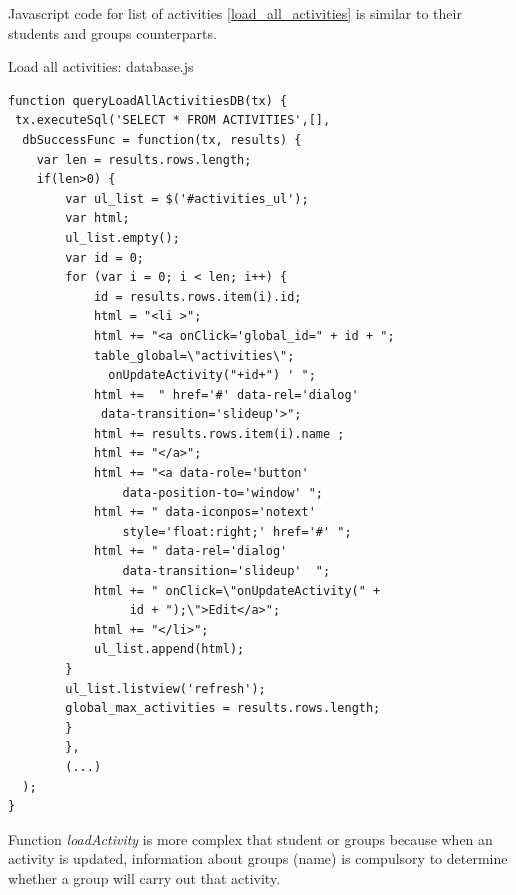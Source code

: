 Javascript code for list of activities \ref{load_all_activities} is similar to their students and groups counterparts.

\begin{bclogo}[couleur=blue!30,arrondi=0.1,ombre=true ] 
{Load all activities: database.js \label{load_all_activities}}
\begin{verbatim}
function queryLoadAllActivitiesDB(tx) {
 tx.executeSql('SELECT * FROM ACTIVITIES',[],
  dbSuccessFunc = function(tx, results) {
    var len = results.rows.length;
    if(len>0) {
        var ul_list = $('#activities_ul');
        var html;
        ul_list.empty();
        var id = 0;
        for (var i = 0; i < len; i++) {
            id = results.rows.item(i).id;
            html = "<li >";
            html += "<a onClick='global_id=" + id + "; 
            table_global=\"activities\";
              onUpdateActivity("+id+") ' ";
            html +=  " href='#' data-rel='dialog'
             data-transition='slideup'>";
            html += results.rows.item(i).name ;
            html += "</a>";
            html += "<a data-role='button' 
                data-position-to='window' ";
            html += " data-iconpos='notext' 
                style='float:right;' href='#' ";
            html += " data-rel='dialog' 
                data-transition='slideup'  ";
            html += " onClick=\"onUpdateActivity(" +
                 id + ");\">Edit</a>";
            html += "</li>";
            ul_list.append(html);
        }
        ul_list.listview('refresh');
        global_max_activities = results.rows.length;
        }
        },
        (...)
  );
}
\end{verbatim}
\end{bclogo}
Function \textit{loadActivity} is more complex that student or groups because
when an  activity is updated, information about groups (name) is compulsory to determine 
whether a group will carry out that activity.


